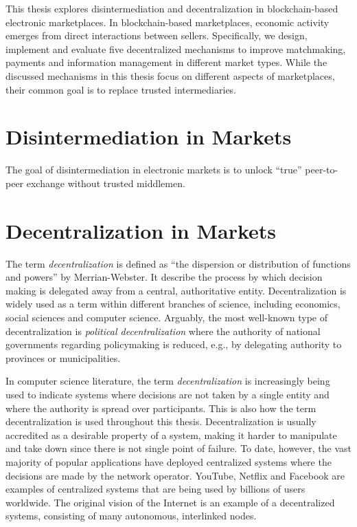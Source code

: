 This thesis explores disintermediation and decentralization in blockchain-based electronic marketplaces.
In blockchain-based marketplaces, economic activity emerges from direct interactions between sellers.
Specifically, we design, implement and evaluate five decentralized mechanisms to improve matchmaking, payments and information management in different market types.
While the discussed mechanisms in this thesis focus on different aspects of marketplaces, their common goal is to replace trusted intermediaries. 

\section{Disintermediation in Markets}
The goal of disintermediation in electronic markets is to unlock \enquote{true} peer-to-peer exchange without trusted middlemen.

\section{Decentralization in Markets}
The term \emph{decentralization} is defined as \enquote{the dispersion or distribution of functions and powers} by Merrian-Webster.
It describe the process by which decision making is delegated away from a central, authoritative entity.
Decentralization is widely used as a term within different branches of science, including economics, social sciences and computer science.
Arguably, the most well-known type of decentralization is \emph{political decentralization} where the authority of national governments regarding policymaking is reduced, e.g., by delegating authority to provinces or municipalities.

In computer science literature, the term \emph{decentralization} is increasingly being used to indicate systems where decisions are not taken by a single entity and where the authority is spread over participants.
This is also how the term decentralization is used throughout this thesis.
Decentralization is usually accredited as a desirable property of a system, making it harder to manipulate and take down since there is not single point of failure.
To date, however, the vast majority of popular applications have deployed centralized systems where the decisions are made by the network operator.
YouTube, Netflix and Facebook are examples of centralized systems that are being used by billions of users worldwide.
The original vision of the Internet is an example of a decentralized systems, consisting of many autonomous, interlinked nodes.


